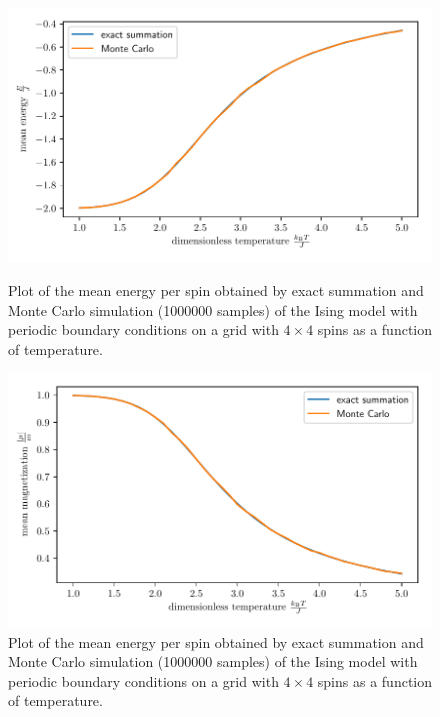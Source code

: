 \documentclass[a4paper,10pt,bibtotoc]{scrartcl}
\begin{document}
\begin{figure}[H]
	\centering
	\includegraphics[width=\linewidth]{energy_mc_moresamples.pdf}
	\caption{Plot of the mean energy per spin obtained by exact summation and Monte Carlo simulation (1000000 samples) of the Ising model with periodic boundary conditions on a grid with $4\times 4$ spins as a function of temperature.}
	\label{fig:fig12}
	\includegraphics[width=\linewidth]{magnetization_mc_moresamples.pdf}
	\caption{Plot of the mean energy per spin obtained by exact summation and Monte Carlo simulation (1000000 samples) of the Ising model with periodic boundary conditions on a grid with $4\times 4$ spins as a function of temperature.}
	\label{fig:fig13}
\end{figure}
\end{document}
